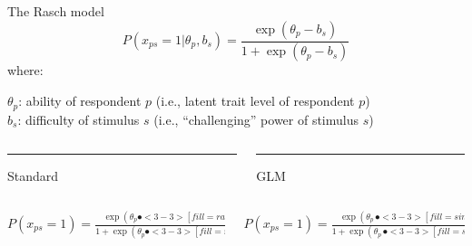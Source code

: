 \documentclass[compress]{beamer}
\begin{document}
\begin{frame}{The Rasch model}
	\begin{equation*}
		P(x_{ps} = 1| \theta_p, b_s) = \dfrac{\exp( \theta_p - b_s)}{1 + \exp(\theta_p - b_s)}
	\end{equation*}
	where: 
	
	$\theta_p$: ability of respondent $p$ (i.e., latent trait level of respondent $p$)\\
	$b_s$: difficulty of stimulus $s$ (i.e., ``challenging'' power of stimulus $s$)\\
	
	\vspace{2.5mm}
	\onslide<2-> 
	\begin{columns}[T] %
		\begin{column}{.50\linewidth}
			\textcolor{diff}{\rule{\linewidth}{2pt}}
			\begin{center}
				\textcolor{diff}{	\large{{Standard}}}
			\end{center}
			
		\end{column}
		
		\hfill%
		\begin{column}{.50\linewidth}
			\textcolor{single}{\rule{\linewidth}{2pt}}
			\begin{center}
				\textcolor{single}{\large{{GLM}}}	
			\end{center}
			
		\end{column}%
	\end{columns}
	
	\vspace{2.5mm}
	\begin{columns}[T]
		\begin{column}{.50\linewidth}
			\vspace*{2.5mm}
			$P(x_{ps} = 1) = \displaystyle \frac{\exp(\theta_p \spot<3-3>[fill=rasch!50]{-} b_s)}{1 + \exp(\theta_p \spot<3-3>[fill=rasch!50]{-} b_s)}$
		\end{column}
		\hfill
		
		\begin{column}{.50\linewidth}
			
			
			\vspace*{2.5mm}
			$P(x_{ps} = 1) = \displaystyle \frac{\exp(\theta_p \, \spot<3-3>[fill=single!50]{+} \, b_s)}{1 + \exp(\theta_p \, \spot<3-3>[fill=single!50]{+} \, b_s)}$
		\end{column}
	\end{columns}	
	
\end{frame}
\end{document}
